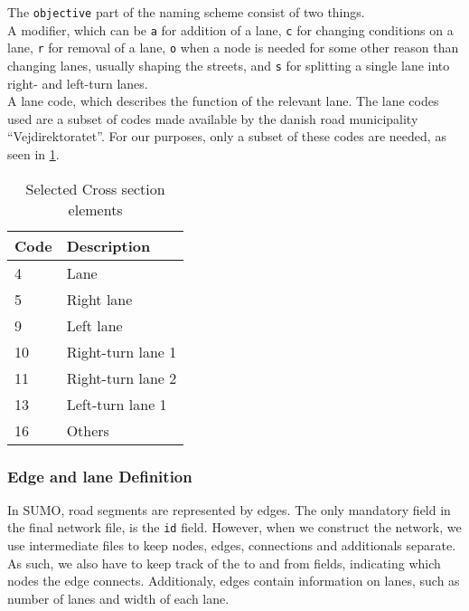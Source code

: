 The \texttt{objective} part of the naming scheme consist of two things.\\
A modifier, which can be \texttt{a} for addition of a lane, \texttt{c} for
changing conditions on a lane, \texttt{r} for removal of a lane, \texttt{o} when
a node is needed for some other reason than changing lanes, usually shaping the streets, and \texttt{s} for
splitting a single lane into right- and left-turn lanes.\\
A lane code, which describes the function of the relevant lane. The
lane codes used are a subset of codes made available by the danish road
municipality ``Vejdirektoratet''. For our purposes, only a subset of these codes
are needed, as seen in \cref{tab:cse}.

\begin{table}[!htb]
  \centering
  \begin{tabular}{|l|l|}\hline
    Code & Description\\\hline
    4 & Lane\\ 
    5 & Right lane\\
    9 & Left lane\\
    10 & Right-turn lane 1\\
    11 & Right-turn lane 2\\
    13 & Left-turn lane 1\\
    16 & Others\\\hline
  \end{tabular}
  \caption{Selected Cross section elements}
  \label{tab:cse}
\end{table}





\subsubsection{Edge and lane Definition}

In SUMO, road segments are represented by edges. 
The only mandatory field in the final network file, is the \texttt{id} field. 
However, when we construct the network, we use intermediate files to keep nodes, edges, connections and additionals separate. 
As such, we also have to keep track of the to and from
 fields, indicating which nodes the edge connects. Additionaly, edges contain information on lanes, such as number of lanes and width of each lane.\newline

